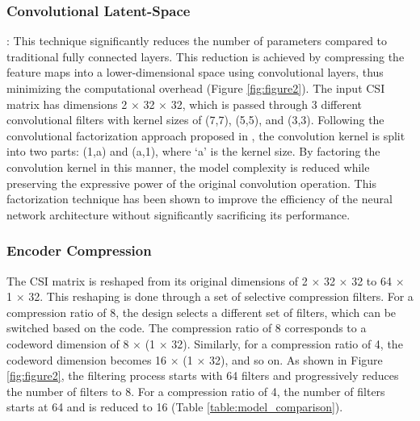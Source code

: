 \documentclass[lettersize,journal]{IEEEtran}
\begin{document}
\subsubsection{Convolutional Latent-Space}:
This technique significantly reduces the number of parameters compared to traditional fully connected layers. This reduction is achieved by compressing the feature maps into a lower-dimensional space using convolutional layers, thus minimizing the computational overhead (Figure \ref{fig:figure2}). 
The input CSI matrix has dimensions 2 \begin{math} \times \end{math} 32 \begin{math} \times \end{math} 32, which is passed through 3 different convolutional filters with kernel sizes of (7,7), (5,5), and (3,3). Following the convolutional factorization approach proposed in \cite{abn}, the convolution kernel is split into two parts: (1,a) and (a,1), where ‘a’ is the kernel size. By factoring the convolution kernel in this manner, the model complexity is reduced while preserving the expressive power of the original convolution operation. This factorization technique has been shown to improve the efficiency of the neural network architecture without significantly sacrificing its performance.

\subsubsection{Encoder Compression}
The CSI matrix is reshaped from its original dimensions of 2 \begin{math} \times \end{math} 32 \begin{math} \times \end{math} 32 to 64 \begin{math} \times \end{math} 1 \begin{math} \times \end{math} 32. This reshaping is done through a set of selective compression filters. For a compression ratio of 8, the design selects a different set of filters, which can be switched based on the code. The compression ratio of 8 corresponds to a codeword dimension of 8 \begin{math} \times \end{math} (1 \begin{math} \times \end{math} 32). Similarly, for a compression ratio of 4, the codeword dimension becomes 16 \begin{math} \times \end{math} (1 \begin{math} \times \end{math} 32), and so on.
As shown in Figure \ref{fig:figure2}, the filtering process starts with 64 filters and progressively reduces the number of filters to 8. For a compression ratio of 4, the number of filters starts at 64 and is reduced to 16 (Table \ref{table:model_comparison}).
\end{document}
